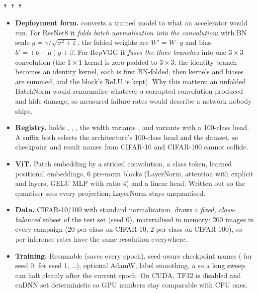 \subsection{, , , }
\begin{itemize}
\item \textbf{Deployment form.}  converts a trained model to what an accelerator would run. For ResNet8 it \emph{folds batch normalisation into the convolution}: with BN scale $g=\gamma/\sqrt{\sigma^2+\varepsilon}$, the folded weights are $W'=W\cdot g$ and bias $b'=(b-\mu)g+\beta$. For RepVGG it \emph{fuses the three branches} into one $3\times3$ convolution (the $1\times1$ kernel is zero-padded to $3\times3$, the identity branch becomes an identity kernel, each is first BN-folded, then kernels and biases are summed, and the block's ReLU is kept).
 Why this matters: an unfolded BatchNorm would renormalise whatever a corrupted convolution produced and hide damage, so measured failure rates would describe a network nobody ships.
\item \textbf{Registry.}  holds , , , the width variants , and  variants with a 100-class head. A  suffix both selects the architecture's 100-class head and the dataset, so checkpoint and result names from CIFAR-10 and CIFAR-100 cannot collide.
\item \textbf{ViT.} Patch embedding by a strided convolution, a class token, learned positional embeddings, 6 pre-norm blocks (LayerNorm, attention with explicit  and   layers, GELU MLP with ratio 4) and a linear head. Written out so the quantiser sees every projection; LayerNorm stays unquantised.
\item \textbf{Data.} CIFAR-10/100 with standard normalisation.  draws a \emph{fixed, class-balanced} subset of the test set (seed 0), materialised in memory: 200 images in every campaign (20 per class on CIFAR-10, 2 per class on CIFAR-100), so per-inference rates have the same resolution everywhere.
\item \textbf{Training.} Resumable (saves every epoch), seed-aware checkpoint names ( for seed 0,  for seed 1, \ldots), optional AdamW, label smoothing, a  so a long sweep can halt cleanly after the current epoch. On CUDA, TF32 is disabled and cuDNN set deterministic so GPU numbers stay comparable with CPU ones.
\end{itemize}


